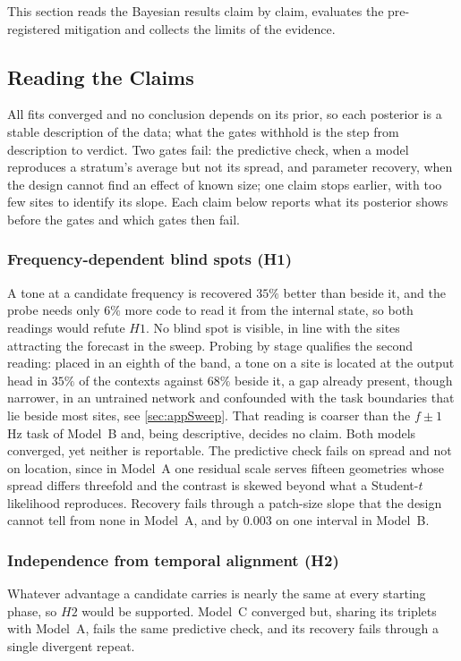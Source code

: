 This section reads the Bayesian results claim by claim, evaluates the pre-registered mitigation and collects the limits of the evidence.

\subsection{Reading the Claims}\label{sec:claims}
All fits converged and no conclusion depends on its prior, so each posterior is a stable description of the data; what the gates withhold is the step from description to verdict. Two gates fail: the predictive check, when a model reproduces a stratum's average but not its spread, and parameter recovery, when the design cannot find an effect of known size; one claim stops earlier, with too few sites to identify its slope. Each claim below reports what its posterior shows before the gates and which gates then fail.

\subsubsection*{Frequency-dependent blind spots (H1)}
A tone at a candidate frequency is recovered $35\%$ better than beside it, and the probe needs only $6\%$ more code to read it from the internal state, so both readings would refute $H1$. No blind spot is visible, in line with the sites attracting the forecast in the sweep. {\color{red}Probing by stage qualifies the second reading: placed in an eighth of the band, a tone on a site is located at the output head in $35\%$ of the contexts against $68\%$ beside it, a gap already present, though narrower, in an untrained network and confounded with the task boundaries that lie beside most sites, see \autoref{sec:appSweep}. That reading is coarser than the $f\pm1$\,Hz task of Model~B and, being descriptive, decides no claim.} %
Both models converged, yet neither is reportable. The predictive check fails on spread and not on location, since in Model~A one residual scale serves fifteen geometries whose spread differs threefold and the contrast is skewed beyond what a Student-$t$ likelihood reproduces. Recovery fails through a patch-size slope that the design cannot tell from none in Model~A, and by $0.003$ on one interval in Model~B.

\subsubsection*{Independence from temporal alignment (H2)}
Whatever advantage a candidate carries is nearly the same at every starting phase, so $H2$ would be supported. Model~C converged but, sharing its triplets with Model~A, fails the same predictive check, and its recovery fails through a single divergent repeat.

